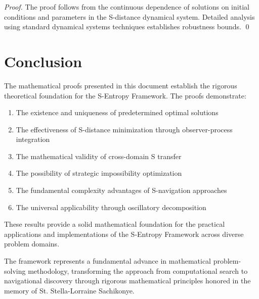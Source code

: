 \documentclass[12pt,a4paper]{article}
\begin{document}
\begin{proof}
The proof follows from the continuous dependence of solutions on initial conditions and parameters in the S-distance dynamical system. Detailed analysis using standard dynamical systems techniques establishes robustness bounds. \qed
\end{proof}

\section{Conclusion}

The mathematical proofs presented in this document establish the rigorous theoretical foundation for the S-Entropy Framework. The proofs demonstrate:

\begin{enumerate}
\item The existence and uniqueness of predetermined optimal solutions
\item The effectiveness of S-distance minimization through observer-process integration
\item The mathematical validity of cross-domain S transfer
\item The possibility of strategic impossibility optimization
\item The fundamental complexity advantages of S-navigation approaches
\item The universal applicability through oscillatory decomposition
\end{enumerate}

These results provide a solid mathematical foundation for the practical applications and implementations of the S-Entropy Framework across diverse problem domains.

The framework represents a fundamental advance in mathematical problem-solving methodology, transforming the approach from computational search to navigational discovery through rigorous mathematical principles honored in the memory of St. Stella-Lorraine Sachikonye.
\end{document}
